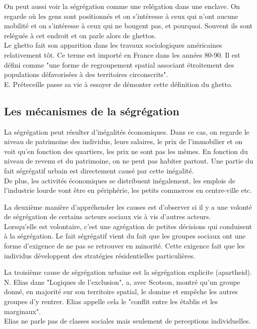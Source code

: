 \documentclass[10pt, a4paper, openany]{book}
\begin{document}
On peut aussi voir la ségrégation comme une relégation dans une enclave. On regarde où les gens sont positionnés et on s'intéresse à ceux qui n'ont aucune mobilité et on s'intéresse à ceux qui ne bougent pas, et pourquoi. Souvent ils sont relégués à cet endroit et on parle alors de ghettos. \\
Le ghetto fait son apparition dans les travaux sociologiques américaines relativement tôt. Ce terme est importé en France dans les années 80-90. Il est défini comme "une forme de regroupement spatial associant étroitement des populations défavorisées à des territoires circonscrits". \\
E. Préteceille passe sa vie à essayer de démonter cette définition du ghetto. 

\subsection{Les mécanismes de la ségrégation}

La ségrégation peut résulter d'inégalités économiques. Dans ce cas, on regarde le niveau de patrimoine des individus, leurs salaires, le prix de l'immobilier et on voit qu'en fonction des quartiers, les prix ne sont pas les mêmes. En fonction du niveau de revenu et du patrimoine, on ne peut pas habiter partout. Une partie du fait ségrégatif urbain est directement causé par cette inégalité. \\
De plus, les activités économiques se distribuent inégalement, les emplois de l'industrie lourde vont être en périphérie, les petits commerces en centre-ville etc. 


La deuxième manière d'appréhender les causes est d'observer si il y a une volonté de ségrégation de certains acteurs sociaux vis à vis d'autres acteurs. \\
Lorsqu'elle est volontaire, c'est une agrégation de petites décisions qui conduisent à la ségrégation. Le fait ségrégatif vient du fait que les groupes sociaux ont une forme d'exigence de ne pas se retrouver en minorité. Cette exigence fait que les individus développent des stratégies résidentielles particulières. 


La troisième cause de ségrégation urbaine est la ségrégation explicite (apartheid). N. Elias dans "Logiques de l'exclusion", a, avec Scotson, montré qu'un groupe donné, en majorité sur son territoire spatial, le domine et empêche les autres groupes d'y rentrer. Elias appelle cela le "conflit entre les établis et les marginaux". \\
Elias ne parle pas de classes sociales mais seulement de perceptions individuelles. 
\end{document}
